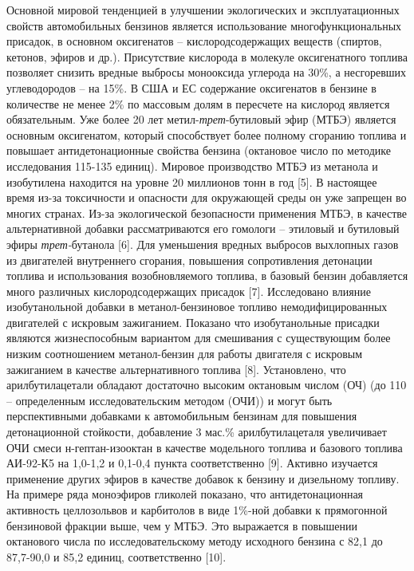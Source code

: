 \begin{multicols}{2}
Основной мировой тенденцией в улучшении экологических и эксплуатационных
свойств автомобильных бензинов является использование
многофункциональных присадок, в основном оксигенатов --
кислородсодержащих веществ (спиртов, кетонов, эфиров и др.). Присутствие
кислорода в молекуле оксигенатного топлива позволяет снизить вредные
выбросы монооксида углерода на 30\%, а несгоревших углеводородов -- на
15\%. В США и ЕС содержание оксигенатов в бензине в количестве не менее
2\% по массовым долям в пересчете на кислород является обязательным. Уже
более 20 лет метил-\emph{трет}-бутиловый эфир (МТБЭ) является основным
оксигенатом, который способствует более полному сгоранию топлива и
повышает антидетонационные свойства бензина (октановое число по методике
исследования 115-135 единиц). Мировое производство МТБЭ из метанола и
изобутилена находится на уровне 20 миллионов тонн в год {[}5{]}. В
настоящее время из-за токсичности и опасности для окружающей среды он
уже запрещен во многих странах. Из-за экологической безопасности
применения МТБЭ, в качестве альтернативной добавки рассматриваются его
гомологи -- этиловый и бутиловый эфиры \emph{трет-}бутанола {[}6{]}. Для
уменьшения вредных выбросов выхлопных газов из двигателей внутреннего
сгорания, повышения сопротивления детонации топлива и использования
возобновляемого топлива, в базовый бензин добавляется много различных
кислородсодержащих присадок {[}7{]}. Исследовано влияние изобутанольной
добавки в метанол-бензиновое топливо немодифицированных двигателей с
искровым зажиганием. Показано что изобутанольные присадки являются
жизнеспособным вариантом для смешивания с существующим более низким
соотношением метанол-бензин для работы двигателя с искровым зажиганием в
качестве альтернативного топлива {[}8{]}. Установлено, что
арилбутилацетали обладают достаточно высоким октановым числом (ОЧ) (до
110 -- определенным исследовательским методом (ОЧИ)) и могут быть
перспективными добавками к автомобильным бензинам для повышения
детонационной стойкости, добавление 3 мас.\% арилбутилацеталя
увеличивает ОЧИ смеси н-гептан-изооктан в качестве модельного топлива и
базового топлива АИ-92-К5 на 1,0-1,2 и 0,1-0,4 пункта соответственно
{[}9{]}. Активно изучается применение других эфиров в качестве добавок к
бензину и дизельному топливу. На примере ряда моноэфиров гликолей
показано, что антидетонационная активность целлозольвов и карбитолов в
виде 1\%-ной добавки к прямогонной бензиновой фракции выше, чем у МТБЭ.
Это выражается в повышении октанового числа по исследовательскому методу
исходного бензина с 82,1 до 87,7-90,0 и 85,2 единиц, соответственно
{[}10{]}. \hl{}


\end{multicols}
